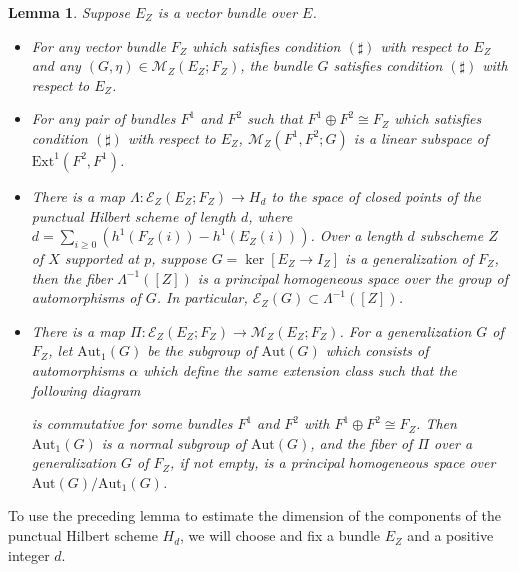 \documentclass[12pt,oneside,reqno]{amsart}
\newtheorem{lemma}[theorem]{Lemma}
\theoremstyle{definition}
\begin{document}
\begin{lemma}
Suppose $E_Z$ is a vector bundle over $E$.
\begin{itemize}
\item[(1)]
For any vector bundle $F_Z$ which satisfies condition $(\sharp)$ with respect to $E_Z$ and any $(G, \eta) \in \mathcal{M}_Z(E_Z; F_Z)$, the bundle $G$ satisfies condition $(\sharp)$ with respect to $E_Z$. 
\item[(2)] 
For any pair of bundles $F^1$ and $F^2$ such that $F^1 \oplus F^2 \cong F_Z$ which satisfies condition $(\sharp)$ with respect to $E_Z$, $\mathcal{M}_Z(F^1, F^2; G)$ is a linear subspace of $\mathrm{Ext}^1(F^2, F^1)$.
\item[(3)]
There is a map $\Lambda: \mathcal{E}_Z(E_Z; F_Z) \to H_d$ to the space of closed points of the punctual Hilbert scheme of length $d$, where $d = \sum_{i \geq 0} (h^1(F_Z(i)) - h^1(E_Z(i)))$. Over a length $d$ subscheme $Z$ of $X$ supported at $p$, suppose $G = \ker [E_Z \to I_Z]$ is a generalization of $F_Z$, then the fiber $\Lambda^{-1}([Z])$ is a principal homogeneous space over the group of automorphisms of $G$. In particular, $\mathcal{E}_Z(G) \subset \Lambda^{-1}([Z])$.
\item[(4)] 
There is a map $\Pi: \mathcal{E}_Z(E_Z; F_Z) \to \mathcal{M}_Z(E_Z; F_Z)$. For a generalization $G$ of $F_Z$, let $\mathrm{Aut}_1(G)$ be the subgroup of $\mathrm{Aut}(G)$ which consists of automorphisms $\alpha$ which define the same extension class such that the following diagram
\begin{center}
\end{center}
is commutative for some bundles $F^1$ and $F^2$ with $F^1 \oplus F^2 \cong F_Z$. Then $\mathrm{Aut}_1(G)$ is a normal subgroup of $\mathrm{Aut}(G)$, and the fiber of $\Pi$ over a generalization $G$ of $F_Z$, if not empty, is a principal homogeneous space over $\mathrm{Aut}(G)/\mathrm{Aut}_1(G)$.
\end{itemize}
\end{lemma}

To use the preceding lemma to estimate the dimension of the components of the punctual Hilbert scheme $H_d$, we will choose and fix a bundle $E_Z$ and a positive integer $d$. 
\end{document}
